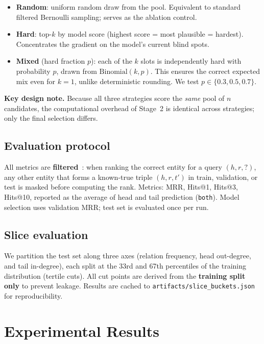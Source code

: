 \documentclass[10pt,twocolumn,letterpaper]{article}
\begin{document}
\begin{itemize}
  \item \textbf{Random}: uniform random draw from the pool. Equivalent to
    standard filtered Bernoulli sampling; serves as the ablation control.
  \item \textbf{Hard}: top-$k$ by model score (highest score = most plausible
    = hardest). Concentrates the gradient on the model's current blind spots.
  \item \textbf{Mixed} (hard fraction $p$): each of the $k$ slots is
    independently hard with probability $p$, drawn from $\mathrm{Binomial}(k,p)$.
    This ensures the correct expected mix even for $k=1$, unlike deterministic
    rounding. We test $p\in\{0.3,0.5,0.7\}$.
\end{itemize}

\textbf{Key design note.} Because all three strategies score the \emph{same}
pool of $n$ candidates, the computational overhead of Stage~2 is identical
across strategies; only the final selection differs.

\subsection{Evaluation protocol}

All metrics are \textbf{filtered}~\cite{bordes2013translating}: when ranking
the correct entity for a query $(h,r,?)$, any other entity that forms a
known-true triple $(h,r,t')$ in train, validation, or test is masked before
computing the rank.
Metrics: MRR, Hits@1, Hits@3, Hits@10, reported as the average of head and
tail prediction (\texttt{both}).
Model selection uses validation MRR; test set is evaluated once per run.

\subsection{Slice evaluation}

We partition the test set along three axes (relation frequency, head
out-degree, and tail in-degree), each split at the 33rd and 67th percentiles
of the training distribution (tertile cuts). All cut points are derived from
the \textbf{training split only} to prevent leakage. Results are cached to
\texttt{artifacts/slice\_buckets.json} for reproducibility.

\section{Experimental Results}
\label{sec:results}
\end{document}
